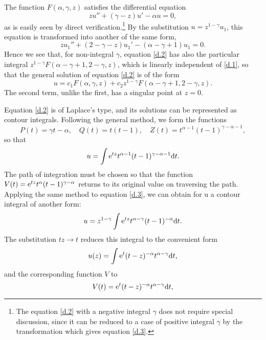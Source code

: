 The function $ F (\alpha, \gamma, z) $ satisfies the differential equation
\begin{equation}\label{d.2}
zu''+(\gamma-z)u'-\alpha u=0,
\end{equation}
as is easily seen by direct verification.\footnote{The equation \eqref{d.2} with a negative integral $\gamma$ does not require special discussion, since it can be reduced to a case of positive integral $\gamma$ by the transformation which gives equation \eqref{d.3}.
} By the substitution $ u = z^{1-\gamma} u_1 $, this equation is transformed into another of the same form,
\begin{equation}\label{d.3}
zu_1''+(2-\gamma-z)u_1'-(\alpha-\gamma+1)u_1=0.
\end{equation}
Hence we see that, for non-integral $\gamma$, equation \eqref{d.2} has also the particular integral $ z^{1-\gamma}F (\alpha-\gamma+1, 2-\gamma, z) $, which is linearly independent of \eqref{d.1}, so that the general solution of equation \eqref{d.2} is of the form
\begin{equation}\label{d.4}
u=c_1F(\alpha,\gamma,z)+c_2z^{1-\gamma}F(\alpha-\gamma+1,2-\gamma,z).
\end{equation}
The second term, unlike the first, has a singular point at $ z = 0 $.

Equation \eqref{d.2} is of Laplace’s type, and its solutions can be represented as contour integrals. Following the general method, we form the functions
\[ P(t)=\gamma t-\alpha,\quad Q(t)=t(t-1),\quad Z(t)=t^{\alpha-1}(t-1)^{\gamma-\alpha-1}, \]
so that
\begin{equation}\label{d.5}
u=\int\mathrm{e}^{tz}t^{\alpha-1}(t-1)^{\gamma-\alpha-1}\mathrm{d} t.
\end{equation}
The path of integration must be chosen so that the function $ V(t) = \mathrm{e}^{tz}t^\alpha (t - 1)^{\gamma-\alpha} $ returns to its original value on traversing the path. Applying the same method to equation \eqref{d.3}, we can obtain for u a contour integral of another form:
\[ u=z^{1-\gamma}\int\mathrm{e}^{tz}t^{\alpha-\gamma}(t-1)^{-\alpha}\mathrm{d} t. \]
The substitution $ tz \to t $ reduces this integral to the convenient form
\begin{equation}\label{d.6}
u(z)=\int\mathrm{e}^t(t-z)^{-\alpha}t^{\alpha-\gamma}\mathrm{d} t,
\end{equation}
and the corresponding function $ V $ to
\[ V(t)=\mathrm{e}^t(t-z)^{-\alpha}t^{\alpha-\gamma}\mathrm{d} t, \]



